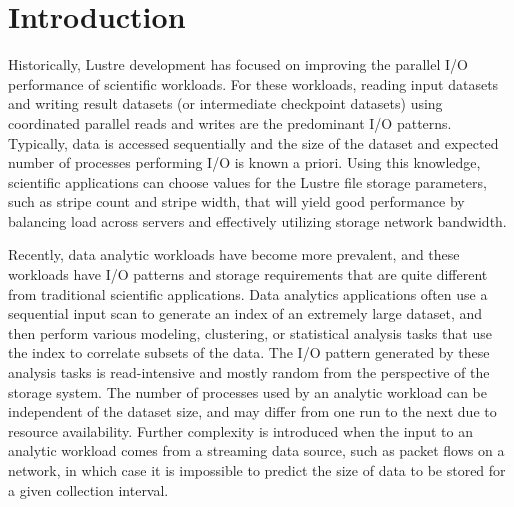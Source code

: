 \documentclass[conference,compsoc]{IEEEtran}
\begin{document}
\maketitle


\IEEEdisplaynontitleabstractindextext




\IEEEpeerreviewmaketitle



\section{Introduction}

Historically, Lustre development has focused on improving the parallel I/O performance of scientific workloads. For these workloads, reading input datasets and writing result datasets (or intermediate checkpoint datasets) using coordinated parallel reads and writes are the predominant I/O patterns. Typically, data is accessed sequentially and the size of the dataset and expected number of processes performing I/O is known a priori. Using this knowledge, scientific applications can choose values for the Lustre file storage parameters, such as stripe count and stripe width, that will yield good performance by balancing load across servers and effectively utilizing storage network bandwidth. 

Recently, data analytic workloads have become more prevalent, and these workloads have I/O patterns and storage requirements that are quite different from traditional scientific applications. Data analytics applications often use a sequential input scan to generate an index of an extremely large dataset, and then perform various modeling, clustering, or statistical analysis tasks that use the index to correlate subsets of the data. The I/O pattern generated by these analysis tasks is read-intensive and mostly random from the perspective of the storage system. The number of processes used by an analytic workload can be independent of the dataset size, and may differ from one run to the next due to resource availability. Further complexity is introduced when the input to an analytic workload comes from a streaming data source, such as packet flows on a network, in which case it is impossible to predict the size of data to be stored for a given collection interval.
\end{document}
